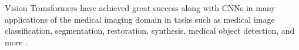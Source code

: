 Vision Transformers have achieved great success along with CNNs in many applications of the medical imaging domain in tasks such as medical image classification, segmentation, restoration, synthesis, medical object detection, and more \cite{Shamshad2023}.




